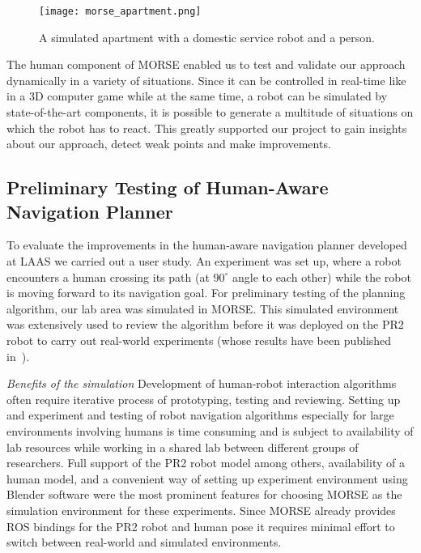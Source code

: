 \documentclass{llncs}
\begin{document}
\begin{figure}[t]
      \centering
      \texttt{[image: morse\_apartment.png]}
      \caption{A simulated apartment with a domestic service robot and a person.}
      \label{fig|apartment}
\end{figure}

The human component of MORSE enabled us to test and validate our approach
dynamically in a variety of situations. Since it can be controlled in real-time
like in a 3D computer game while at the same time, a robot can be simulated by
state-of-the-art components, it is possible to generate a multitude of
situations on which the robot has to react. This greatly supported our project
to gain insights about our approach, detect weak points and make improvements.

\subsection{Preliminary Testing of Human-Aware Navigation Planner}
\label{sc:navigation}

To evaluate the improvements in the human-aware navigation planner developed at
LAAS we carried out a user study. An experiment was set up,
where a robot encounters a human crossing its path (at $90^{\circ }$ angle to
each other) while the robot is moving forward to its navigation goal. For
preliminary testing of the planning algorithm, our lab area was simulated in
MORSE. This simulated environment was extensively used
to review the algorithm before it was deployed on the PR2 robot to carry out
real-world experiments (whose results have been published
in~\cite{ThibaultKruse2014}).


\emph{Benefits of the simulation} Development of human-robot interaction
algorithms often require iterative process of prototyping, testing and
reviewing. Setting up and experiment and testing of robot navigation algorithms
especially for large environments involving humans is time consuming and is
subject to availability of lab resources while working in a shared lab between
different groups of researchers. Full support of the PR2 robot model among
others, availability of a human model, and a convenient way of setting up
experiment environment using Blender software were the most prominent features
for choosing MORSE as the simulation environment for these experiments. Since
MORSE already provides ROS bindings for the PR2 robot and human pose it requires
minimal effort to switch between real-world and simulated environments.
\end{document}
